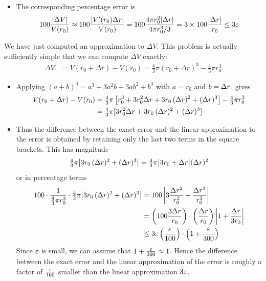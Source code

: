 \begin{eg}
\begin{itemize}
\item The corresponding percentage error is
\begin{align*}
100\frac{|\Delta V|}{V(r_0)}
\approx 100\frac{|V'(r_0)\Delta r|}{V(r_0)}
= 100\frac{4\pi r_0^2|\Delta r|}{4\pi r_0^3/3}
= 3\times 100\frac{|\Delta r|}{r_0}
\le 3\varepsilon
\end{align*}
\end{itemize}
We have just computed an approximation to $\Delta V$. This problem is actually
sufficiently simple that we can compute $\Delta V$ exactly:
\begin{align*}
  \Delta V &=  V(r_0 + \Delta r) - V(r_0)
	    = \tfrac{4}{3} \pi (r_0 + \Delta r)^3
	      - \tfrac{4}{3} \pi r_0^3
\end{align*}
\begin{itemize}
 \item Applying $(a+b)^3=a^3+3a^2b+3ab^2+b^3$ with $a=r_0$ and $b=\Delta r$, gives
\begin{align*}
V(r_0+\Delta r)-V(r_0)&=\tfrac{4}{3}\pi
\left[r_0^3+3r_0^2\Delta r+3r_0\,(\Delta r)^2+(\Delta r)^3\right] - \tfrac{4}{3}\pi  r_0^3\\
&=\tfrac{4}{3}\pi[3r_0^2\Delta r+3r_0\,(\Delta r)^2+(\Delta r)^3]
\end{align*}

\item Thus the difference between the exact error and the linear approximation
to the error is obtained by retaining only the last two terms in the square brackets. This
has magnitude
\begin{align*}
\tfrac{4}{3}\pi\big|3r_0\,(\Delta r)^2+(\Delta r)^3\big|
=\tfrac{4}{3}\pi\big|3r_0+\Delta r\big|(\Delta r)^2
\end{align*}
or in percentage terms
\begin{align*}
100\cdot \dfrac{1}{\tfrac{4}{3}\pi r_0^3} \cdot
\tfrac{4}{3}\pi \big|3r_0\,(\De r)^2+(\De r)^3\big|
%
&=100\left|3\frac{\De r^2}{r_0^2}+\frac{\De r^3}{r_0^3}\right|\\
%
&=\left(100 \frac{3\De r}{r_0}\right)
\cdot \left(\frac{\De r}{r_0}\right)
\left|1 +\frac{\De r}{3r_0}\right|\\
%
& \le 3\veps \left(\frac{\veps}{100}\right)\cdot \left(1+\frac{\veps}{300}\right)
\end{align*}
Since $\varepsilon$ is small, we can assume that $1 + \frac{\varepsilon}{300} \approx 1$. Hence the
difference between the exact error and the linear approximation of the error is roughly a
factor of $\tfrac{\varepsilon}{100}$ smaller than the linear approximation $3\varepsilon$.



\end{itemize}
\end{eg}
